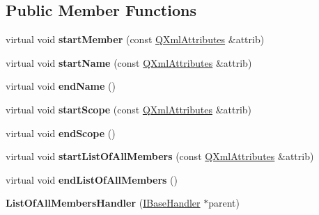\subsection*{Public Member Functions}
\begin{DoxyCompactItemize}
\item 
\mbox{\label{class_list_of_all_members_handler_aec5a1999ed6794e3e63d1845ba81aef9}} 
virtual void {\bfseries start\+Member} (const \mbox{\hyperlink{class_q_xml_attributes}{Q\+Xml\+Attributes}} \&attrib)
\item 
\mbox{\label{class_list_of_all_members_handler_a67c03eae929afb345ff9c24efc46eef3}} 
virtual void {\bfseries start\+Name} (const \mbox{\hyperlink{class_q_xml_attributes}{Q\+Xml\+Attributes}} \&attrib)
\item 
\mbox{\label{class_list_of_all_members_handler_ae644f13b142a545c8599929ec4c5f5fc}} 
virtual void {\bfseries end\+Name} ()
\item 
\mbox{\label{class_list_of_all_members_handler_aeda584e6579244d4a4dbdb00c0100151}} 
virtual void {\bfseries start\+Scope} (const \mbox{\hyperlink{class_q_xml_attributes}{Q\+Xml\+Attributes}} \&attrib)
\item 
\mbox{\label{class_list_of_all_members_handler_aa13b4c1f1997726a2250bcf621e949dc}} 
virtual void {\bfseries end\+Scope} ()
\item 
\mbox{\label{class_list_of_all_members_handler_a4c19559c65760613e363a70067ade08a}} 
virtual void {\bfseries start\+List\+Of\+All\+Members} (const \mbox{\hyperlink{class_q_xml_attributes}{Q\+Xml\+Attributes}} \&attrib)
\item 
\mbox{\label{class_list_of_all_members_handler_a32802f7c5b0a68d2e951306e92431063}} 
virtual void {\bfseries end\+List\+Of\+All\+Members} ()
\item 
\mbox{\label{class_list_of_all_members_handler_ab0fb2af5c4458349e14b868cf82dfbfc}} 
{\bfseries List\+Of\+All\+Members\+Handler} (\mbox{\hyperlink{class_i_base_handler}{I\+Base\+Handler}} $\ast$parent)

\end{DoxyCompactItemize}
